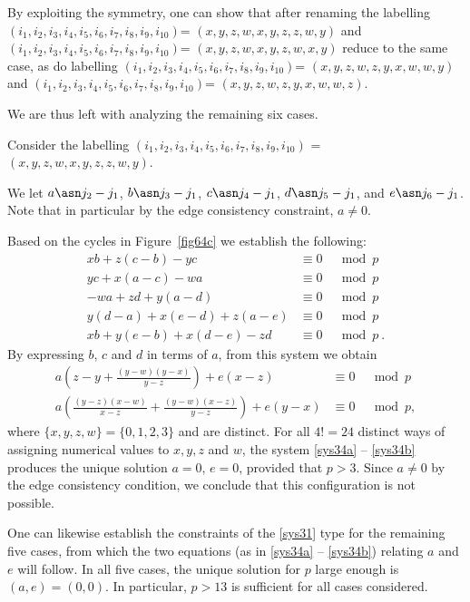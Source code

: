 {By exploiting the symmetry, one can show that after renaming the
labelling $(i_1,i_2,i_3,i_4,i_5,i_6,i_7,i_8,i_9,i_{10})$=
$(x,y,z,w,x,y,z,z,w,y)$ and
$(i_1,i_2,i_3,i_4,i_5,i_6,i_7,i_8,i_9,i_{10})$=
$(x,y,z,w,x,y,z,w,x,y)$ reduce to the same case, as do labelling
$(i_1,i_2,i_3,i_4,i_5,i_6,i_7,i_8,i_9,i_{10})$=
$(x,y,z,w,z,y,x,w,w,y)$ and
$(i_1,i_2,i_3,i_4,i_5,i_6,i_7,i_8,i_9,i_{10})$=
$(x,y,z,w,z,y,x,w,w,z)$.

We are thus left with analyzing the remaining six cases.

Consider the labelling
$(i_1,i_2,i_3,i_4,i_5,i_6,i_7,i_8,i_9,i_{10})$ =
$(x,y,z,w,x,y,z,z,w,y)$.

We let $a \asn j_2-j_1$, $b \asn j_3-j_1$, $c \asn j_4-j_1$,
 $d \asn j_5-j_1$, and $e \asn j_6-j_1$.  Note that in particular
 by the edge consistency constraint, $a \neq 0$.

Based on the cycles in Figure~\ref{fig64c} we establish the
following:
  \begin{equation}\label{sys31}\begin{array}{cccc}
 xb+z(c-b)-yc &\equiv 0 &\mod p\\
 yc+x(a-c)-wa &\equiv 0 &\mod p\\
 -wa+zd+y(a-d) &\equiv 0 &\mod p\\
 y(d-a)+x(e-d)+z(a-e) &\equiv 0 &\mod p\\
 xb+y(e-b)+x(d-e)-zd &\equiv 0 &\mod p~.
 \end{array}\end{equation}
 By expressing $b$, $c$ and $d$ in terms of $a$, from this system
we obtain
\begin{eqnarray}\label{sys34a}
a\left(z-y+\frac{(y-w)(y-x)}{y-z}\right)+e(x-z) &\equiv 0 &\mod
p\\
\label{sys34b}a\left(\frac{(y-z)(x-w)}{x-z}+\frac{(y-w)(x-z)}{y-z}\right)+e(y-x)&\equiv
0 &\mod p,
\end{eqnarray}
where $\{x,y,z,w\} =\{0,1,2,3\}$ and are distinct. For all $4!=24$
distinct ways of assigning numerical values to $x,y,z$ and $w$,
the system \eqref{sys34a} -- \eqref{sys34b} produces the unique
solution $a=0$, $e=0$, provided that $p>3$. Since $a\neq 0$ by the
edge consistency condition, we conclude that this configuration is
not possible.

One can likewise establish the constraints of the \eqref{sys31}
type for the remaining five cases, from which the two equations
(as in \eqref{sys34a} -- \eqref{sys34b}) relating $a$ and $e$ will
follow. In all five cases, the unique solution for $p$ large
enough is $(a,e)=(0,0)$. In particular, $p>13$ is sufficient for
all cases considered.


}
